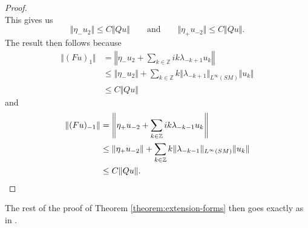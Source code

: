 \documentclass[reqno,12pt,letterpaper]{amsart}
\theoremstyle{definition}
\theoremstyle{remark}
\theoremstyle{definition}
\numberwithin{equation}{section}
\newcommand{\Z}{\mathbb{Z}}
\begin{document}
\begin{proof}
\begin{equation*}
\end{equation*}
This gives us 
$$\Vert \eta_-u_2\Vert \leq C \Vert Qu\Vert\qquad \text{and}\qquad \Vert \eta_+u_{-2}\Vert \leq C \Vert Qu\Vert. $$
The result then follows because
\begin{equation*}
\begin{alignedat}{1}
\Vert (Fu)_1\Vert &= \left\Vert \eta_-u_2 + \sum_{k\in \Z} i k\lambda_{-k+1} u_{k}\right\Vert\\
&\leq \Vert \eta_- u_2\Vert + \sum_{k\in \Z}k\Vert \lambda_{-k+1}\Vert_{L^\infty(SM)} \Vert u_{k}\Vert\\
&\leq C \Vert Qu\Vert
\end{alignedat}
\end{equation*}
and 
\begin{align*}
\Vert (Fu)_{-1}\Vert &= \left\Vert \eta_+u_{-2} + \sum_{k\in \Z} ik\lambda_{-k-1} u_{k}\right\Vert\\
&\leq \Vert \eta_+ u_{-2}\Vert + \sum_{k\in \Z}k\Vert \lambda_{-k-1}\Vert_{L^\infty(SM)}\Vert  u_{k}\Vert\\
&\leq C \Vert Qu\Vert.\qedhere
\end{align*}
\end{proof}

The rest of the proof of Theorem \ref{theorem:extension-forms} then goes exactly as in \cite{assylbekov17}.


\end{document}
